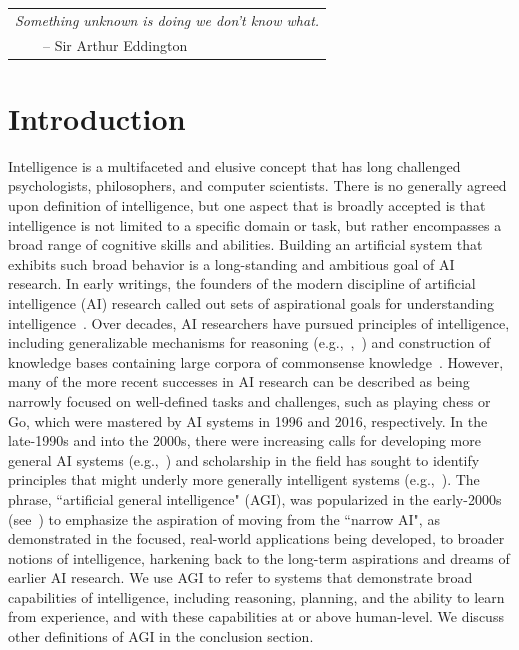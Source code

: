 \begin{flushright}
    \begin{tabular}{l}
    {\em Something unknown is doing we don't know what.}\\
    \ \ \ \ -- Sir Arthur Eddington
    \end{tabular}
    \end{flushright}
    
    \section{Introduction}
    \label{sec:intro}   
    
    Intelligence is a multifaceted and elusive concept that has long challenged psychologists, philosophers, and computer scientists. There is no generally agreed upon definition of intelligence, but one aspect that is broadly accepted is that intelligence is not limited to a specific domain or task, but rather encompasses a broad range of cognitive skills and abilities.
    Building an artificial system that exhibits such broad behavior is a long-standing and ambitious goal of AI research.
    In early writings, the founders of the modern discipline of artificial intelligence (AI) research called out sets of aspirational goals for understanding intelligence~\cite{mccarthy2006proposal}.
    Over decades, AI researchers have pursued principles of intelligence, including generalizable mechanisms for reasoning (e.g.,~\cite{newellshawsimonGPS1959},~\cite{lindsay1993dendral}) and construction of knowledge bases containing large corpora of commonsense knowledge~\cite{lenat1995cyc}.
    However, many of the more recent successes in AI research can be described as being narrowly focused on well-defined tasks and challenges, such as playing chess or Go, which were mastered by AI systems in 1996 and 2016, respectively. In the late-1990s and into the 2000s, there were increasing calls for developing more general AI systems (e.g.,~\cite{selman1996challenge}) and scholarship in the field has sought to identify principles that might underly more generally intelligent systems (e.g.,~\cite{legg2008machine, gershman2015computational}). The phrase, ``artificial general intelligence" (AGI), was popularized in the early-2000s (see~\cite{goertzel2014artificial}) to emphasize the aspiration of moving from the ``narrow AI", as demonstrated in the focused, real-world applications being developed, to broader notions of intelligence, harkening back to the long-term aspirations and dreams of earlier AI research.
    We use AGI to refer to systems that demonstrate broad capabilities of intelligence, including reasoning, planning, and the ability to learn from experience, and with these capabilities at or above human-level. We discuss other definitions of AGI in the conclusion section.
    \newline 
    
